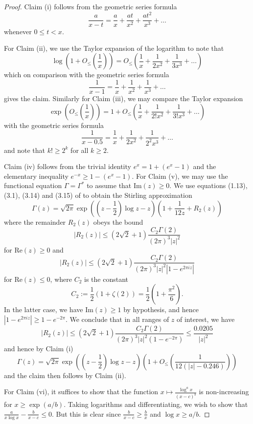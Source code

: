 \begin{proof}  Claim (i) follows from the geometric series formula
$$ \frac{a}{x-t} = \frac{a}{x} + \frac{at}{x^2} + \frac{at^2}{x^3} + \dots$$
whenever $0 \leq t < x$.

For Claim (ii), we use the Taylor expansion of the logarithm to note that
$$\log\left( 1 + O_{\leq}\left(\frac{1}{x}\right) \right) = O_{\leq}\left(\frac{1}{x} + \frac{1}{2x^2} + \frac{1}{3x^3} + \dots\right)$$
which on comparison with the geometric series formula
$$\frac{1}{x-1} = \frac{1}{x} + \frac{1}{x^2} + \frac{1}{x^3} + \dots$$
gives the claim.  Similarly for Claim (iii), we may compare the Taylor expansion
$$\exp\left( O_{\leq}\left(\frac{1}{x}\right) \right) = 1 + O_{\leq}\left(\frac{1}{x} + \frac{1}{2! x^2} + \frac{1}{3! x^3} + \dots\right)$$
with the geometric series formula
$$ \frac{1}{x-0.5} = \frac{1}{x} + \frac{1}{2x^2} + \frac{1}{2^2 x^3} + \dots$$
and note that $k! \geq 2^k$ for all $k \geq 2$.

Claim (iv) follows from the trivial identity $e^x = 1 + (e^x-1)$ and the elementary inequality $e^{-x} \geq 1 - (e^x-1)$.
For Claim (v), we may use the functional equation $\Gamma = \Gamma^*$ to assume that $\mathrm{Im}(z) \geq 0$.  We use equations (1.13), (3.1), (3.14) and (3.15) of \cite{boyd} to obtain the Stirling approximation
$$ \Gamma(z) = \sqrt{2\pi} \exp\left( \left(z-\frac{1}{2}\right) \log z - z \right) \left(1 + \frac{1}{12 z} + R_2(z) \right)$$
where the remainder $R_2(z)$ obeys the bound
$$ |R_2(z)| \leq (2 \sqrt{2}+1) \frac{C_2 \Gamma(2)}{(2\pi)^3 |z|^2} $$
for $\mathrm{Re}(z) \geq 0$ and
$$|R_2(z)| \leq (2 \sqrt{2}+1) \frac{C_2 \Gamma(2)}{(2\pi)^3 |z|^2 |1 - e^{2\pi i z}|} $$
for $\mathrm{Re}(z) \leq 0$, where $C_2$ is the constant
$$ C_2 := \frac{1}{2} (1 + \zeta(2)) = \frac{1}{2} \left(1 + \frac{\pi^2}{6}\right).$$
In the latter case, we have $\mathrm{Im}(z) \geq 1$ by hypothesis, and hence $|1 - e^{2\pi i z}| \geq 1 - e^{-2\pi}$.  We conclude that in all ranges of $z$ of interest, we have
$$|R_2(z)| \leq (2 \sqrt{2}+1) \frac{C_2 \Gamma(2)}{(2\pi)^3 |z|^2 (1 - e^{-2\pi})} \leq \frac{0.0205}{|z|^2}$$
and hence by Claim (i)
$$ \Gamma(z) = \sqrt{2\pi} \exp\left( \left(z-\frac{1}{2}\right) \log z - z \right) \left(1 + O_{\leq}\left( \frac{1}{12(|z| - 0.246)} \right)\right) $$
and the claim then follows by Claim (ii).  

For Claim (vi), it suffices to show that the function $x \mapsto \frac{\log^a x}{(x-c)^b}$ is non-increasing for $x \geq \exp(a/b)$.  Taking logarithms and differentiating, we wish to show that $\frac{a}{x \log x} - \frac{b}{x-c} \leq 0$.  But this is clear since $\frac{b}{x-c} \geq \frac{b}{x}$ and $\log x \geq a/b$.
\end{proof}

